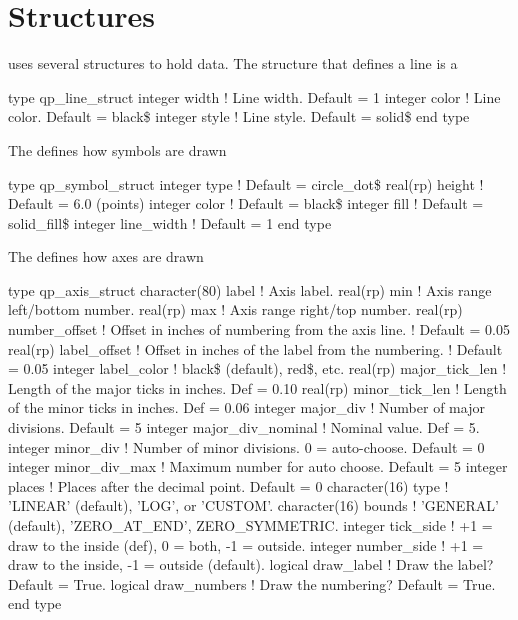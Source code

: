 \section{Structures}
\label{s:qp.structs}

\quickplot uses several structures to hold data. The structure that
defines a line is a 
\begin{example}
  type qp_line_struct
    integer width   ! Line width. Default = 1
    integer color   ! Line color. Default = black\$
    integer style   ! Line style. Default = solid\$
  end type
\end{example}

The  defines how symbols are drawn 
\begin{example}
  type qp_symbol_struct
    integer  type        ! Default = circle_dot\$
    real(rp) height      ! Default = 6.0 (points)
    integer  color       ! Default = black\$
    integer  fill        ! Default = solid_fill\$
    integer  line_width  ! Default = 1
  end type
\end{example}

The  defines how axes are drawn 
\begin{example}
  type qp_axis_struct
    character(80) label       ! Axis label.
    real(rp) min              ! Axis range left/bottom number.
    real(rp) max              ! Axis range right/top number.
    real(rp) number_offset    ! Offset in inches of numbering from the axis line. 
                              !  Default = 0.05
    real(rp) label_offset     ! Offset in inches of the label from the numbering.
                              !  Default = 0.05
    integer label_color       ! black\$ (default), red\$, etc. 
    real(rp) major_tick_len   ! Length of the major ticks in inches. Def = 0.10
    real(rp) minor_tick_len   ! Length of the minor ticks in inches. Def = 0.06
    integer major_div         ! Number of major divisions. Default = 5
    integer major_div_nominal ! Nominal value. Def = 5.
    integer minor_div         ! Number of minor divisions. 0 = auto-choose. Default = 0
    integer minor_div_max     ! Maximum number for auto choose. Default = 5
    integer places            ! Places after the decimal point. Default = 0
    character(16) type        ! 'LINEAR' (default), 'LOG', or 'CUSTOM'.
    character(16) bounds      ! 'GENERAL' (default), 'ZERO_AT_END', ZERO_SYMMETRIC.
    integer tick_side         ! +1 = draw to the inside (def), 0 = both, -1 = outside.
    integer number_side       ! +1 = draw to the inside, -1 = outside (default).
    logical draw_label        ! Draw the label? Default = True.
    logical draw_numbers      ! Draw the numbering? Default = True.
  end type
\end{example}

